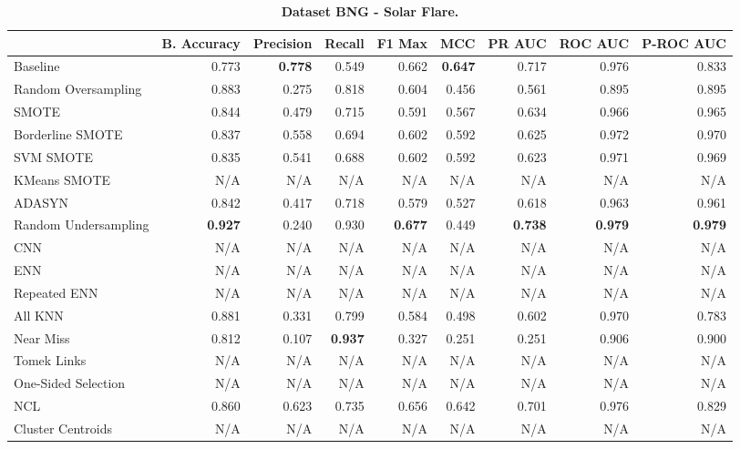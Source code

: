 \begin{table}[H]
    \centering
    \setlength\tabcolsep{2pt}
    \begin{tabularx}{\textwidth}{lRRRRRRRR}
        & B. Accuracy & Precision & Recall & F1 Max & MCC & PR AUC & ROC AUC & P-ROC AUC \\
        \midrule
        Baseline & 0.773 & \textbf{0.778} & 0.549 & 0.662 & \textbf{0.647} & 0.717 & 0.976 & 0.833 \\
        Random Oversampling & 0.883 & 0.275 & 0.818 & 0.604 & 0.456 & 0.561 & 0.895 & 0.895 \\
        SMOTE & 0.844 & 0.479 & 0.715 & 0.591 & 0.567 & 0.634 & 0.966 & 0.965 \\
        Borderline SMOTE & 0.837 & 0.558 & 0.694 & 0.602 & 0.592 & 0.625 & 0.972 & 0.970 \\
        SVM SMOTE & 0.835 & 0.541 & 0.688 & 0.602 & 0.592 & 0.623 & 0.971 & 0.969 \\
        KMeans SMOTE & N/A & N/A & N/A & N/A & N/A & N/A & N/A & N/A \\
        ADASYN & 0.842 & 0.417 & 0.718 & 0.579 & 0.527 & 0.618 & 0.963 & 0.961 \\
        Random Undersampling & \textbf{0.927} & 0.240 & 0.930 & \textbf{0.677} & 0.449 & \textbf{0.738} & \textbf{0.979} & \textbf{0.979} \\
        CNN & N/A & N/A & N/A & N/A & N/A & N/A & N/A & N/A \\
        ENN & N/A & N/A & N/A & N/A & N/A & N/A & N/A & N/A \\
        Repeated ENN & N/A & N/A & N/A & N/A & N/A & N/A & N/A & N/A \\
        All KNN & 0.881 & 0.331 & 0.799 & 0.584 & 0.498 & 0.602 & 0.970 & 0.783 \\
        Near Miss & 0.812 & 0.107 & \textbf{0.937} & 0.327 & 0.251 & 0.251 & 0.906 & 0.900 \\
        Tomek Links & N/A & N/A & N/A & N/A & N/A & N/A & N/A & N/A \\
        One-Sided Selection & N/A & N/A & N/A & N/A & N/A & N/A & N/A & N/A \\
        NCL & 0.860 & 0.623 & 0.735 & 0.656 & 0.642 & 0.701 & 0.976 & 0.829 \\
        Cluster Centroids & N/A & N/A & N/A & N/A & N/A & N/A & N/A & N/A \\
    \end{tabularx}
    \vspace{1mm}
    \caption{\textbf{Dataset BNG - Solar Flare.}}
\end{table}
